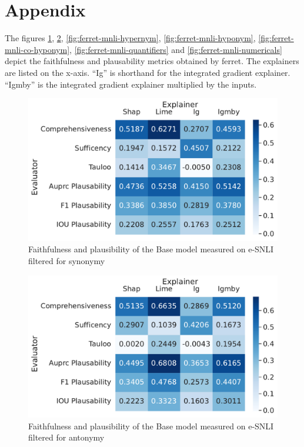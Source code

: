 \section{Appendix} \label{sec:appendix}

The figures \ref{fig:ferret-mnli-synonym}, \ref{fig:ferret-mnli-antonym}, \ref{fig:ferret-mnli-hypernym}, \ref{fig:ferret-mnli-hyponym}, \ref{fig:ferret-mnli-co-hyponym}, \ref{fig:ferret-mnli-quantifiers} and \ref{fig:ferret-mnli-numericals} depict the faithfulness and plausability metrics obtained by ferret. The explainers are listed on the x-axis. \enquote{Ig} is shorthand for the integrated gradient explainer. \enquote{Igmby} is the integrated gradient explainer multiplied by the inputs.

\begin{figure}[h!]
    \centering
    \includegraphics[width=\textwidth]{./images/ferret_heatmaps_phenomena/default_mnli/synonym.pdf}
    \caption{Faithfulness and plausibility of the Base model measured on \acs{e-SNLI} filtered for synonymy}
    \label{fig:ferret-mnli-synonym}
\end{figure}

\begin{figure}[h!]
    \centering
    \includegraphics[width=\textwidth]{./images/ferret_heatmaps_phenomena/default_mnli/antonym.pdf}
    \caption{Faithfulness and plausibility of the Base model measured on \acs{e-SNLI} filtered for antonymy}
    \label{fig:ferret-mnli-antonym}
\end{figure}

